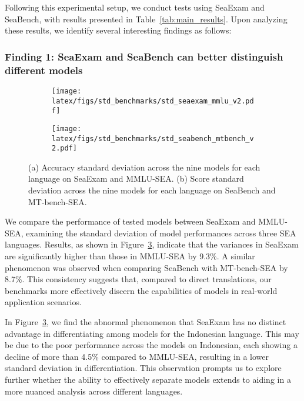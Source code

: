 Following this experimental setup, we conduct tests using SeaExam and SeaBench, with results presented in Table~\ref{tab:main_results}. Upon analyzing these results, we identify several interesting findings as follows:





\subsubsection{Finding 1: SeaExam and SeaBench can better distinguish different models} \label{finding1}
\begin{figure}[htb]
    \centering
    \begin{subfigure}[b]{0.48\linewidth}
        \centering
        \texttt{[image: latex/figs/std\_benchmarks/std\_seaexam\_mmlu\_v2.pdf]}
        \caption{}
        \label{subfig:seaexam_example}
    \end{subfigure}
    \begin{subfigure}[b]{0.48\linewidth}
        \centering
        \texttt{[image: latex/figs/std\_benchmarks/std\_seabench\_mtbench\_v2.pdf]}
        \caption{}
        \label{subfig:seabench_example}
    \end{subfigure}
    \caption{(a) Accuracy standard deviation across the nine models for each language on SeaExam and MMLU-SEA. (b) Score standard deviation across the nine models for each language  on SeaBench and MT-bench-SEA.}
    \label{fig:finding1}
\end{figure}


We compare the performance of tested models between SeaExam and MMLU-SEA, examining the standard deviation of model performances across three SEA languages. Results, as shown in Figure~\ref{fig:finding1}, indicate that the variances in SeaExam are significantly higher than those in MMLU-SEA by 9.3\%.
A similar phenomenon was observed when comparing SeaBench with MT-bench-SEA by 8.7\%.
This consistency suggests that, compared to direct translations, our benchmarks more effectively discern the capabilities of models in real-world application scenarios.


In Figure~\ref{fig:finding1}, we find the abnormal phenomenon that SeaExam has no distinct advantage in differentiating among models for the Indonesian language. 
This may be due to the poor performance across the models on Indonesian, each showing a decline of more than 4.5\% compared to MMLU-SEA, resulting in a lower standard deviation in differentiation.
This observation prompts us to explore further whether the ability to effectively separate models extends to aiding in a more nuanced analysis across different languages. 

